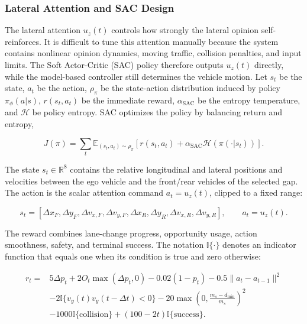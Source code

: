 \subsubsection{Lateral Attention and SAC Design}

The lateral attention \(u_z(t)\) controls how strongly the lateral opinion self-reinforces. It is difficult to tune this attention manually because the system contains nonlinear opinion dynamics, moving traffic, collision penalties, and input limits. The Soft Actor-Critic (SAC) policy therefore outputs \(u_z(t)\) directly, while the model-based controller still determines the vehicle motion. Let \(s_t\) be the state, \(a_t\) be the action, \(\rho_\pi\) be the state-action distribution induced by policy \(\pi_\phi(a|s)\), \(r(s_t,a_t)\) be the immediate reward, \(\alpha_{\mathrm{SAC}}\) be the entropy temperature, and \(\mathcal{H}\) be policy entropy. SAC optimizes the policy by balancing return and entropy,

{\small
\begin{equation}
J(\pi)=\sum_t \mathbb{E}_{(s_t,a_t)\sim\rho_\pi}
\left[r(s_t,a_t)+\alpha_{\mathrm{SAC}}\mathcal{H}\!\left(\pi(\cdot|s_t)\right)\right].
\end{equation}
}

The state \(s_t\in\mathbb{R}^8\) contains the relative longitudinal and lateral positions and velocities between the ego vehicle and the front/rear vehicles of the selected gap. The action is the scalar attention command \(a_t=u_z(t)\), clipped to a fixed range:

{\small
\begin{equation}
s_t=[\Delta x_F,\Delta y_F,\Delta v_{x,F},\Delta v_{y,F},
\Delta x_R,\Delta y_R,\Delta v_{x,R},\Delta v_{y,R}],\qquad
a_t=u_z(t).
\end{equation}
}

The reward combines lane-change progress, opportunity usage, action smoothness, safety, and terminal success. The notation \(\mathbb{I}\{\cdot\}\) denotes an indicator function that equals one when its condition is true and zero otherwise:

{\small
\begin{equation}
\begin{aligned}
r_t={}&5\Delta p_t+2O_t\max(\Delta p_t,0)-0.02(1-p_t)
-0.5\|a_t-a_{t-1}\|^2 \\
&-2\mathbb{I}\{v_y(t)v_y(t-\Delta t)<0\}
-20\max\!\left(0,\frac{m_s-d_{\min}}{m_s}\right)^2 \\
&-1000\mathbb{I}\{\mathrm{collision}\}+(100-2t)\mathbb{I}\{\mathrm{success}\}.
\end{aligned}
\end{equation}
}

